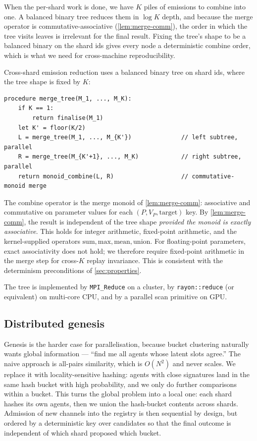 \documentclass[journal,onecolumn,11pt]{IEEEtran}
\theoremstyle{definition}
\begin{document}
When the per-shard work is done, we have $K$ piles of emissions to combine into one. A balanced binary tree reduces them in $\log K$ depth, and because the merge operator is commutative-associative (\cref{lem:merge-comm}), the order in which the tree visits leaves is irrelevant for the final result. Fixing the tree's shape to be a balanced binary on the shard ids gives every node a deterministic combine order, which is what we need for cross-machine reproducibility.

Cross-shard emission reduction uses a balanced binary tree on shard ids, where the tree shape is fixed by $K$:

\begin{verbatim}
procedure merge_tree(M_1, ..., M_K):
    if K == 1:
        return finalise(M_1)
    let K' = floor(K/2)
    L = merge_tree(M_1, ..., M_{K'})              // left subtree, parallel
    R = merge_tree(M_{K'+1}, ..., M_K)            // right subtree, parallel
    return monoid_combine(L, R)                   // commutative-monoid merge
\end{verbatim}

The combine operator is the merge monoid of \cref{lem:merge-comm}: associative and commutative on parameter values for each $(P, V_P, \mathrm{target})$ key. By \cref{lem:merge-comm}, the result is independent of the tree shape \emph{provided the monoid is exactly associative}. This holds for integer arithmetic, fixed-point arithmetic, and the kernel-supplied operators $\mathrm{sum}, \mathrm{max}, \mathrm{mean}, \mathrm{union}$. For floating-point parameters, exact associativity does not hold; we therefore require fixed-point arithmetic in the merge step for cross-$K$ replay invariance. This is consistent with the determinism preconditions of \cref{sec:properties}.

The tree is implemented by \texttt{MPI\_Reduce} on a cluster, by \texttt{rayon::reduce} (or equivalent) on multi-core CPU, and by a parallel scan primitive on GPU.

\subsection{Distributed genesis}

Genesis is the harder case for parallelisation, because bucket clustering naturally wants global information --- ``find me all agents whose latent slots agree.'' The naive approach is all-pairs similarity, which is $O(N^2)$ and never scales. We replace it with locality-sensitive hashing: agents with close signatures land in the same hash bucket with high probability, and we only do further comparisons within a bucket. This turns the global problem into a local one: each shard hashes its own agents, then we union the hash-bucket contents across shards. Admission of new channels into the registry is then sequential by design, but ordered by a deterministic key over candidates so that the final outcome is independent of which shard proposed which bucket.
\end{document}
